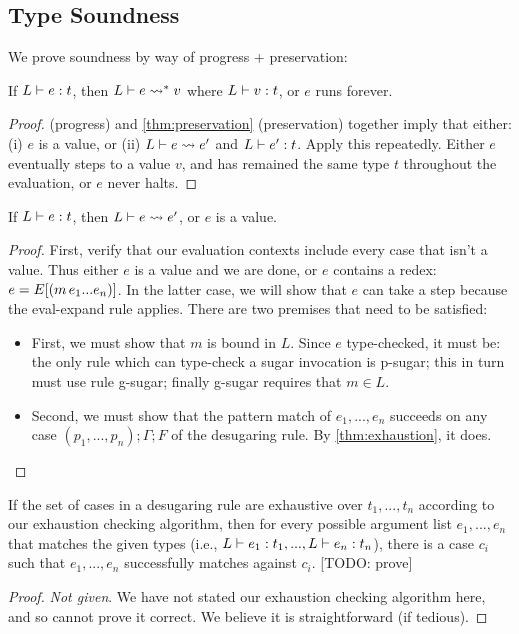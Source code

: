 \subsection{Type Soundness}

We prove soundness by way of progress + preservation:
\begin{theorem}[Soundness]
  If $L \vdash e : t$, then
  $L \vdash e \rightsquigarrow^{*} v$ where $L \vdash v : t$, or $e$ runs forever.
\end{theorem}
\begin{proof}
 (progress) and \cref{thm:preservation}
(preservation) together imply that either:
(i) $e$ is a value, or (ii) $L \vdash e \rightsquigarrow e'$ and $L \vdash e' : t$.
Apply this repeatedly. Either $e$ eventually steps to a value $v$, and
has remained the same type $t$ throughout the evaluation, or $e$ never
halts.
\end{proof}

\begin{lemma}[Progress] \label{thm:progress}
  If $L \vdash e : t$, then
  $L \vdash e \rightsquigarrow e'$, or $e$ is a value.
\end{lemma}
\begin{proof}
  First, verify that our evaluation contexts include every case that
  isn't a value. Thus either $e$ is a value and we are done, or $e$
  contains a redex: $e=E[(m\,e_1 ... e_n)]$.
  In the latter case, we will show that $e$ can take a step because
  the eval-expand rule applies. There are two premises that need to be
  satisfied:
  \begin{itemize}
    \item First, we must show that $m$ is bound in $L$. Since $e$
      type-checked, it must be: the only rule which can type-check a
      sugar invocation is p-sugar; this in turn must use rule
      g-sugar; finally g-sugar requires that $m \in L$.
    \item Second, we must show that the pattern match of $e_1,...,e_n$
      succeeds on any case $(p_1,...,p_n);\Gamma;F$ of the desugaring
      rule. By \cref{thm:exhaustion}, it does.
  \end{itemize}
\end{proof}

\begin{assumption}[Exhaustion] \label{thm:exhaustion}
  If the set of cases in a desugaring rule are exhaustive over
  $t_1,...,t_n$ according to our exhaustion checking algorithm, then
  for every possible argument list $e_1,...,e_n$ that matches the
  given types (i.e., $L \vdash e_1 : t_1,...,L \vdash e_n : t_n$),
  there is a case $c_i$ such that $e_1,...,e_n$ successfully matches
  against $c_i$. [TODO: prove]
\end{assumption}
\begin{proof}
  \emph{Not given}. We have not stated our exhaustion checking
  algorithm here, and so cannot prove it correct. We believe it is
  straightforward (if tedious).
\end{proof}

